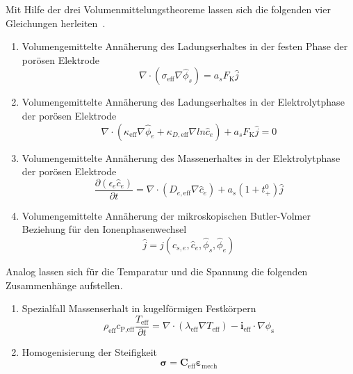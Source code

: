 Mit Hilfe der drei Volumenmittelungstheoreme lassen sich die folgenden vier Gleichungen herleiten~\cite{Doyle1995}.
\begin{enumerate}
    \item Volumengemittelte Annäherung des Ladungserhaltes in der festen Phase der porösen Elektrode
    \begin{equation}
        \nabla \cdot \left(\sigma_{\text{eff}} \nabla \hat{\phi}_{s} \right) = a_s F_{\text{K}} \hat{j}
    \end{equation}
    \item Volumengemittelte Annäherung des Ladungserhaltes in der Elektrolytphase der porösen Elektrode
    \begin{equation}
        \nabla \cdot \left(\kappa_{\text{eff}} \nabla \hat{\phi}_e + \kappa_{D, \text{eff}} \nabla ln \hat{c}_e\right) + a_s F_{\text{K}} \hat{j} = 0
    \end{equation}
    \item Volumengemittelte Annäherung des Massenerhaltes in der Elektrolytphase der porösen Elektrode
    \begin{equation}
        \frac{\partial \left(\epsilon_e \hat{c}_e \right)}{\partial t} = \nabla \cdot \left(D_{e,\text{eff}}\nabla\hat{c}_e\right) + a_s (1+t^0_+) \hat{j}
    \end{equation}
    \item Volumengemittelte Annäherung der mikroskopischen Butler-Volmer Beziehung für den Ionenphasenwechsel
    \begin{equation}
        \hat{j} = j(c_{s,e},\hat{c}_e,\hat{\phi}_s,\hat{\phi}_e)
    \end{equation}
\end{enumerate}

Analog lassen sich für die Temparatur und die Spannung die folgenden Zusammenhänge aufstellen.
\begin{enumerate}
    \item Spezialfall Massenserhalt in kugelförmigen Festkörpern
    \begin{equation}
        \rho_{\text{eff}} c_{\text{P,eff}} \frac{T_{\text{eff}}}{\partial t} = \nabla \cdot (\lambda_{\text{eff}} \nabla T_{\text{eff}}) - \boldsymbol{i}_{\text{eff}} \cdot \nabla \phi_{\text{s}}
    \end{equation}
    \item Homogenisierung der Steifigkeit
    \begin{equation}
    \boldsymbol{\sigma} = \boldsymbol{C}_{\text{eff}} \boldsymbol{\varepsilon}_{\text{mech}} 
    \end{equation}
\end{enumerate}

